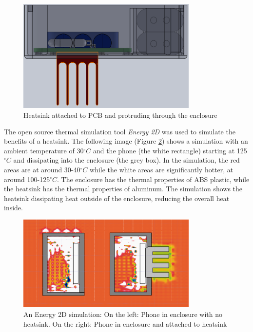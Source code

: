 \documentclass{article}
\numberwithin{figure}{section}
\numberwithin{equation}{section}
\begin{document}
{\begin{figure}[H]
	\centering
	\includegraphics[width=0.8\textwidth]{Assembly4}
	\caption{Heatsink attached to PCB and protruding through the enclosure}
	\label{fig:heatsink}
\end{figure}

The open source thermal simulation tool \textit{Energy 2D} was used to simulate the benefits of a heatsink. The following image (Figure \ref{fig:thermal}) shows a simulation with an ambient temperature of 30$^{\circ}C$ and the phone (the white rectangle) starting at 125$^{\circ}C$ and dissipating into the enclosure (the grey box). In the simulation, the red areas are at around 30-40$^{\circ}C$ while the white areas are significantly hotter, at around 100-125$^{\circ}C$. The enclosure has the thermal properties of ABS plastic, while the heatsink has the thermal properties of aluminum. The simulation shows the heatsink dissipating heat outside of the enclosure, reducing the overall heat inside.

\begin{figure}[H]
	\centering
	\includegraphics[width=0.8\textwidth]{thermal4}
	\caption{An Energy 2D simulation: On the left: Phone in enclosure with no heatsink. On the right: Phone in enclosure and attached to heatsink}
	\label{fig:thermal}
\end{figure}

}
\end{document}
